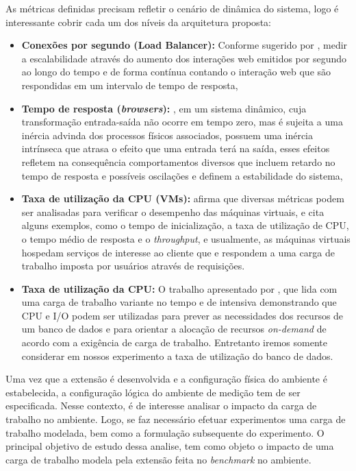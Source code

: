 As métricas definidas precisam refletir o cenário de dinâmica do sistema, logo é interessante cobrir cada um dos níveis da arquitetura proposta:
\begin{itemize}
	\item \textbf{Conexões por segundo (Load Balancer):} Conforme sugerido por , medir a escalabilidade através do aumento dos interações web emitidos por segundo ao longo do tempo e de forma contínua contando o interação web que são respondidas em um intervalo de tempo de resposta,
	\item \textbf{Tempo de resposta (\textit{browsers}):} , em um sistema dinâmico, cuja transformação entrada-saída não ocorre em tempo zero, mas é sujeita a uma inércia advinda dos processos físicos associados, possuem uma inércia intrínseca que atrasa o efeito que uma entrada terá na saída, esses efeitos refletem na consequência comportamentos diversos que incluem retardo no tempo de resposta e possíveis oscilações e definem a estabilidade do sistema, 
	\item \textbf{Taxa de utilização da CPU (VMs):}  afirma que diversas métricas podem ser analisadas para verificar o desempenho das máquinas virtuais, e cita alguns exemplos, como o tempo de inicialização, a taxa de utilização de CPU, o tempo médio de resposta e o \textit{throughput}, e usualmente, as máquinas virtuais hospedam serviços de interesse ao cliente que e respondem a uma carga de trabalho imposta por usuários através de requisições.
	\item \textbf{Taxa de utilização da CPU:} O trabalho apresentado por , que lida com uma carga de trabalho variante no tempo e de intensiva demonstrando que CPU e I/O podem ser utilizadas para prever as necessidades dos recursos de um banco de dados e para orientar a alocação de recursos \textit{on-demand} de acordo com a exigência de carga de trabalho. Entretanto iremos somente considerar em nossos experimento a taxa de utilização do banco de dados.
\end{itemize}


Uma vez que a extensão é desenvolvida e a configuração física do ambiente é estabelecida, a configuração lógica do ambiente de medição tem de ser especificada. Nesse contexto, é de interesse analisar o impacto da carga de trabalho no ambiente. Logo, se faz necessário efetuar experimentos uma carga de trabalho modelada, bem como a formulação subsequente do experimento. 
O principal objetivo de estudo dessa analise, tem como objeto o impacto de uma carga de trabalho modela pela extensão feita no \textit{benchmark} no ambiente.

